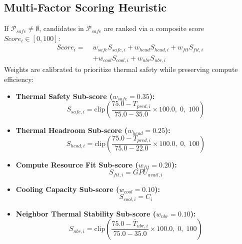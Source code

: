 \documentclass[conference,10pt]{IEEEtran}
\begin{document}
\subsection{Multi-Factor Scoring Heuristic}
If $\mathcal{P}_{safe} \neq \emptyset$, candidates in $\mathcal{P}_{safe}$ are ranked via a composite score $Score_i \in [0, 100]$:
\begin{equation}
\label{eq:score}
\begin{split}
Score_i = \; &w_{safe} S_{safe,i} + w_{head} S_{head,i} + w_{fit} S_{fit,i} \\
&+ w_{cool} S_{cool,i} + w_{nbr} S_{nbr,i}
\end{split}
\end{equation}
Weights are calibrated to prioritize thermal safety while preserving compute efficiency:
\begin{itemize}
    \item \textbf{Thermal Safety Sub-score ($w_{safe} = 0.35$):}
    \begin{equation}
    S_{safe,i} = \text{clip}\left(\frac{75.0 - T_{pred,i}}{75.0 - 35.0} \times 100.0, \; 0, \; 100\right)
    \end{equation}
    \item \textbf{Thermal Headroom Sub-score ($w_{head} = 0.25$):}
    \begin{equation}
    S_{head,i} = \text{clip}\left(\frac{75.0 - T_{pred,i}}{75.0 - 22.0} \times 100.0, \; 0, \; 100\right)
    \end{equation}
    \item \textbf{Compute Resource Fit Sub-score ($w_{fit} = 0.20$):}
    \begin{equation}
    S_{fit,i} = GPU_{avail,i}
    \end{equation}
    \item \textbf{Cooling Capacity Sub-score ($w_{cool} = 0.10$):}
    \begin{equation}
    S_{cool,i} = C_i
    \end{equation}
    \item \textbf{Neighbor Thermal Stability Sub-score ($w_{nbr} = 0.10$):}
    \begin{equation}
    S_{nbr,i} = \text{clip}\left(\frac{75.0 - \bar{T}_{nbr,i}}{75.0 - 35.0} \times 100.0, \; 0, \; 100\right)
    \end{equation}
\end{itemize}
\end{document}
